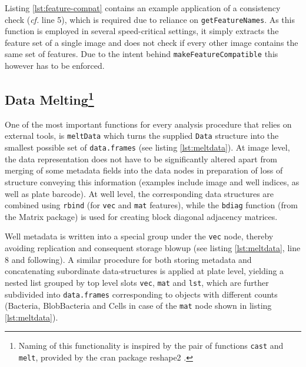 Listing \ref{lst:feature-compat} contains an example application of a consistency check (\textit{cf.} line 5), which is required due to reliance on \texttt{getFeatureNames}. As this function is employed in several speed-critical settings, it simply extracts the feature set of a single image and does not check if every other image contains the same set of features. Due to the intent behind \texttt{makeFeatureCompatible} this however has to be enforced.

\subsection{Data Melting\footnote{Naming of this functionality is inspired by the pair of functions \texttt{cast} and \texttt{melt}, provided by the \acrshort{cran} package reshape2 \citep{Wickham2007}.}}
One of the most important functions for every analysis procedure that relies on external tools, is \texttt{meltData} which turns the supplied \texttt{Data} structure into the smallest possible set of \texttt{data.frames} (see listing \ref{lst:meltdata}). At image level, the data representation does not have to be significantly altered apart from merging of some metadata fields into the data nodes in preparation of loss of structure conveying this information (examples include image and well indices, as well as plate barcode). At well level, the corresponding data structures are combined using \texttt{rbind} (for \texttt{vec} and \texttt{mat} features), while the \texttt{bdiag} function (from the Matrix package) is used for creating block diagonal adjacency matrices.

Well metadata is written into a special group under the \texttt{vec} node, thereby avoiding replication and consequent storage blowup (see listing \ref{lst:meltdata}, line 8 and following). A similar procedure for both storing metadata and concatenating subordinate data-structures is applied at plate level, yielding a nested list grouped by top level slots \texttt{vec}, \texttt{mat} and \texttt{lst}, which are further subdivided into \texttt{data.frames} corresponding to objects with different counts (Bacteria, BlobBacteria and Cells in case of the \texttt{mat} node shown in listing \ref{lst:meltdata}).


